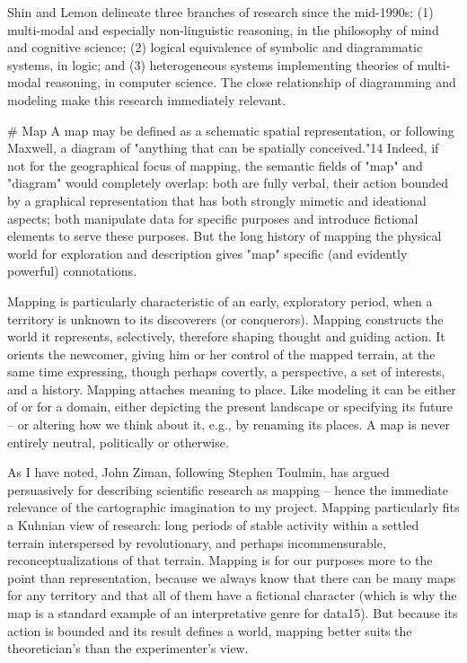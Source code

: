 Shin and Lemon delineate three branches of research since the mid-1990s: (1) multi-modal and especially non-linguistic reasoning, in the philosophy of mind and cognitive science; (2) logical equivalence of symbolic and diagrammatic systems, in logic; and (3) heterogeneous systems implementing theories of multi-modal reasoning, in computer science. The close relationship of diagramming and modeling make this research immediately relevant.

# Map
A map may be defined as a schematic spatial representation, or following Maxwell, a diagram of "anything that can be spatially conceived."14 Indeed, if not for the geographical focus of mapping, the semantic fields of "map" and "diagram" would completely overlap: both are fully verbal, their action bounded by a graphical representation that has both strongly mimetic and ideational aspects; both manipulate data for specific purposes and introduce fictional elements to serve these purposes. But the long history of mapping the physical world for exploration and description gives "map" specific (and evidently powerful) connotations.

Mapping is particularly characteristic of an early, exploratory period, when a territory is unknown to its discoverers (or conquerors). Mapping constructs the world it represents, selectively, therefore shaping thought and guiding action. It orients the newcomer, giving him or her control of the mapped terrain, at the same time expressing, though perhaps covertly, a perspective, a set of interests, and a history. Mapping attaches meaning to place. Like modeling it can be either of or for a domain, either depicting the present landscape or specifying its future – or altering how we think about it, e.g., by renaming its places. A map is never entirely neutral, politically or otherwise.

As I have noted, John Ziman, following Stephen Toulmin, has argued persuasively for describing scientific research as mapping – hence the immediate relevance of the cartographic imagination to my project. Mapping particularly fits a Kuhnian view of research: long periods of stable activity within a settled terrain interspersed by revolutionary, and perhaps incommensurable, reconceptualizations of that terrain. Mapping is for our purposes more to the point than representation, because we always know that there can be many maps for any territory and that all of them have a fictional character (which is why the map is a standard example of an interpretative genre for data15). But because its action is bounded and its result defines a world, mapping better suits the theoretician's than the experimenter's view.

